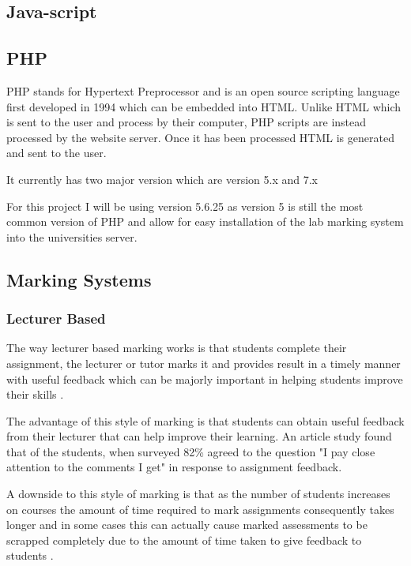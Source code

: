 \documentclass[12pt]{article}  %
\begin{document}
\subsection{Java-script}

\subsection{PHP}
\label{sec:php}

PHP stands for Hypertext Preprocessor and is an open source scripting language first developed in 1994 \cite{noauthor_php:_nodate} which can be embedded into HTML. Unlike HTML which is sent to the user and process by their computer, PHP scripts are instead processed by the website server. Once it has been processed HTML is generated and sent to the user. 

It currently has two major version which are version 5.x and 7.x


For this project I will be using version 5.6.25 as version 5 is still the most common version of PHP and allow for easy installation of the lab marking system into the universities server.



\subsection{Marking Systems}

\subsubsection{Lecturer Based}
The way lecturer based marking works is that students complete their assignment, the lecturer or tutor marks it and provides result in a timely manner with useful feedback which can be majorly important in helping students improve their skills  \cite{tang_investigating_2011}.

The advantage of this style of marking is that students can obtain useful feedback from their lecturer that can help improve their learning.  An article study \cite{higgins_conscientious_2002} found that of the students, when surveyed 82\% agreed to the question "I pay close attention to the comments I get" in response to assignment feedback.

A downside to this style of marking is that as the number of students increases on courses the amount of time required to mark assignments consequently takes longer and in some cases this can actually cause marked assessments to be scrapped completely due to the amount of time taken to give feedback to students \cite{brown_assessment_1999}.
\end{document}
